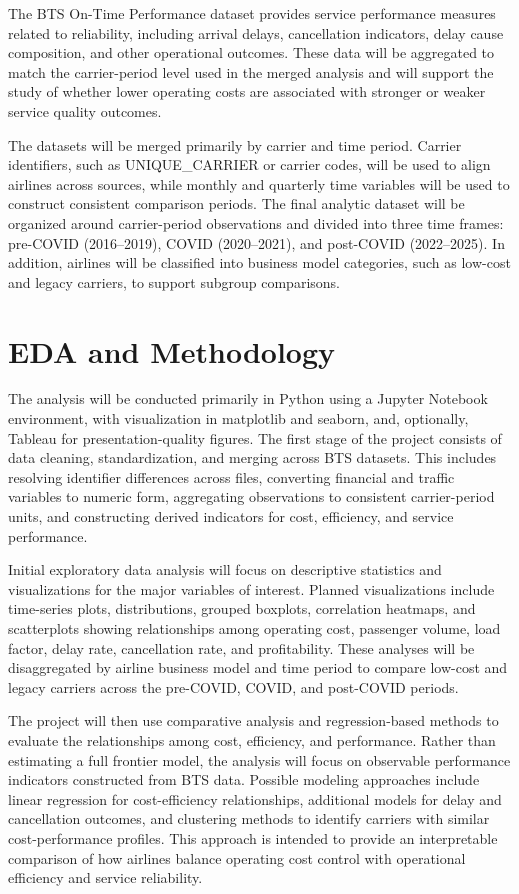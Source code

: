 \documentclass[11pt, letterpaper]{article}
\begin{document}
The BTS On-Time Performance dataset provides service performance measures related to reliability, including arrival delays, cancellation indicators, delay cause composition, and other operational outcomes. These data will be aggregated to match the carrier-period level used in the merged analysis and will support the study of whether lower operating costs are associated with stronger or weaker service quality outcomes.

The datasets will be merged primarily by carrier and time period. Carrier identifiers, such as UNIQUE\_CARRIER or carrier codes, will be used to align airlines across sources, while monthly and quarterly time variables will be used to construct consistent comparison periods. The final analytic dataset will be organized around carrier-period observations and divided into three time frames: pre-COVID (2016--2019), COVID (2020--2021), and post-COVID (2022--2025). In addition, airlines will be classified into business model categories, such as low-cost and legacy carriers, to support subgroup comparisons. 

\section{EDA and Methodology}

The analysis will be conducted primarily in Python using a Jupyter Notebook environment, with visualization in matplotlib and seaborn, and, optionally, Tableau for presentation-quality figures. The first stage of the project consists of data cleaning, standardization, and merging across BTS datasets. This includes resolving identifier differences across files, converting financial and traffic variables to numeric form, aggregating observations to consistent carrier-period units, and constructing derived indicators for cost, efficiency, and service performance.

Initial exploratory data analysis will focus on descriptive statistics and visualizations for the major variables of interest. Planned visualizations include time-series plots, distributions, grouped boxplots, correlation heatmaps, and scatterplots showing relationships among operating cost, passenger volume, load factor, delay rate, cancellation rate, and profitability. These analyses will be disaggregated by airline business model and time period to compare low-cost and legacy carriers across the pre-COVID, COVID, and post-COVID periods.

The project will then use comparative analysis and regression-based methods to evaluate the relationships among cost, efficiency, and performance. Rather than estimating a full frontier model, the analysis will focus on observable performance indicators constructed from BTS data. Possible modeling approaches include linear regression for cost-efficiency relationships, additional models for delay and cancellation outcomes, and clustering methods to identify carriers with similar cost-performance profiles. This approach is intended to provide an interpretable comparison of how airlines balance operating cost control with operational efficiency and service reliability.



\end{document}

